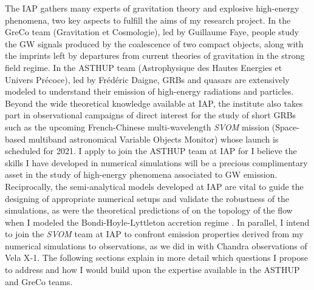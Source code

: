 \documentclass[11pt,onecolumn]{article}
\newcommand{\gw}{GW\xspace}
\newcommand{\grbs}{GRBs\xspace}
\begin{document}
The IAP gathers many experts of gravitation theory and explosive high-energy phenomena, two key aspects to fulfill the aims of my research project. In the GreCo team (Gravitation et Cosmologie), led by Guillaume Faye, people study the \gw signals produced by the coalescence of two compact objects, along with the imprints left by departures from current theories of gravitation in the strong field regime. In the ASTHUP team (Astrophysique des Hautes Energies et Univers Pr\'{e}coce), led by Frédéric Daigne, \grbs and quasars are extensively modeled to understand their emission of high-energy radiations and particles. Beyond the wide theoretical knowledge available at IAP, the institute also takes part in observational campaigns of direct interest for the study of short \grbs such as the upcoming French-Chinese multi-wavelength \textit{SVOM} mission (Space-based multiband astronomical Variable Objects Monitor) whose launch is scheduled for 2021. I apply to join the ASTHUP team at IAP for I believe the skills I have developed in numerical simulations will be a precious complimentary asset in the study of high-energy phenomena associated to \gw emission. Reciprocally, the semi-analytical models developed at IAP are vital to guide the designing of appropriate numerical setups and validate the robustness of the simulations, as were the theoretical predictions of \citet{Foglizzo1997} on the topology of the flow when I modeled the Bondi-Hoyle-Lyttleton accretion regime \citep{ElMellah2015}. In parallel, I intend to join the \textit{SVOM} team at IAP to confront emission properties derived from my numerical simulations to observations, as we did in \citet{Grinberg2017} with Chandra observations of Vela X-1. The following sections explain in more detail which questions I propose to address and how I would build upon the expertise available in the ASTHUP and GreCo teams.\\
\end{document}
